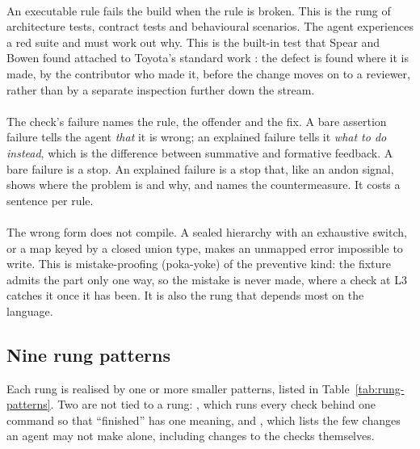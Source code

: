 \paragraph{} An executable rule fails the build when the rule is broken. This
is the rung of architecture tests, contract tests and behavioural scenarios. The agent
experiences a red suite and must work out why. This is the built-in test that
Spear and Bowen found attached to Toyota's standard work \citep{spear1999decoding}: the defect is
found where it is made, by the contributor who made it, before the change moves on to a reviewer,
rather than by a separate inspection further down the stream.

\paragraph{} The check's failure names the rule, the offender and the fix. A
bare assertion failure tells the agent \emph{that} it is wrong; an explained failure tells it
\emph{what to do instead}, which is the difference between summative and formative feedback. A
bare failure is a stop. An explained failure is a stop that, like an andon signal, shows where
the problem is and why, and names the countermeasure. It costs a sentence per rule.

\paragraph{} The wrong form does not compile. A sealed hierarchy with an
exhaustive switch, or a map keyed by a closed union type, makes an unmapped error impossible to
write. This is mistake-proofing (poka-yoke) of the preventive kind: the fixture admits the part
only one way, so the mistake is never made, where a check at L3 catches it once it has been. It is
also the rung that depends most on the language.

\subsection{Nine rung patterns}

Each rung is realised by one or more smaller patterns, listed in Table~\ref{tab:rung-patterns}.
Two are not tied to a rung: , which runs every check behind one command so
that ``finished'' has one meaning, and , which lists the few changes an
agent may not make alone, including changes to the checks themselves.

